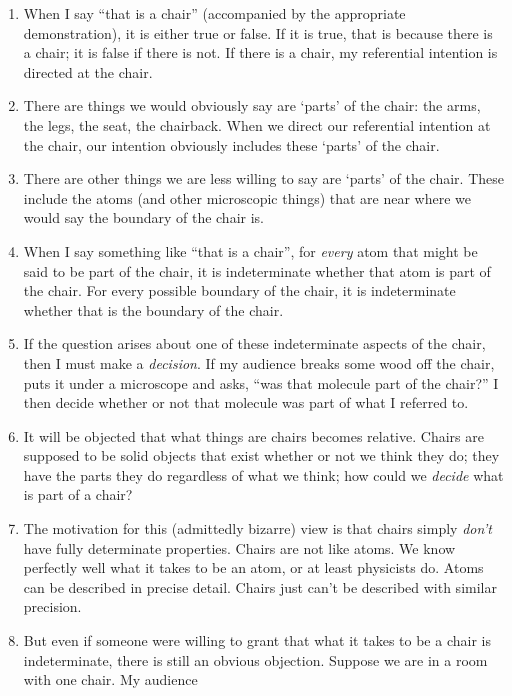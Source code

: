 \documentclass[11pt]{article}
\begin{document}
\begin{spacing}{1.5}
\begin{enumerate}
  \item When I say ``that is a chair'' (accompanied by the appropriate
    demonstration), it is either true or false.  If it is true, that
    is because there is a chair; it is false if there is not.  If
    there is a chair, my referential intention is directed at the
    chair.
  \item There are things we would obviously say are `parts' of the
    chair: the arms, the legs, the seat, the chairback.  When we
    direct our referential intention at the chair, our intention
    obviously includes these `parts' of the chair.
  \item There are other things we are less willing to say are `parts'
    of the chair.  These include the atoms (and other microscopic
    things) that are near where we would say the boundary of the chair
    is.
  \item When I say something like ``that is a chair'', for {\em every}
    atom that might be said to be part of the chair, it is
    indeterminate whether that atom is part of the chair.  For every
    possible boundary of the chair, it is indeterminate whether that
    is the boundary of the chair.
  \item If the question arises about one of these indeterminate
    aspects of the chair, then I must make a {\em decision}.  If my
    audience breaks some wood off the chair, puts it under a
    microscope and asks, ``was that molecule part of the chair?'' I
    then decide whether or not that molecule was part of what I
    referred to.
  \item It will be objected that what things are chairs becomes
    relative.  Chairs are supposed to be solid objects that exist
    whether or not we think they do; they have the parts they do
    regardless of what we think; how could we {\em decide} what is
    part of a chair?
  \item The motivation for this (admittedly bizarre) view is that
    chairs simply {\em don't} have fully determinate properties.
    Chairs are not like atoms.  We know perfectly well what it takes
    to be an atom, or at least physicists do.  Atoms can be described
    in precise detail.  Chairs just can't be described with similar
    precision.
  \item But even if someone were willing to grant that what it takes
    to be a chair is indeterminate, there is still an obvious
    objection.  Suppose we are in a room with one chair.  My audience

\end{enumerate}
\end{spacing}
\end{document}
